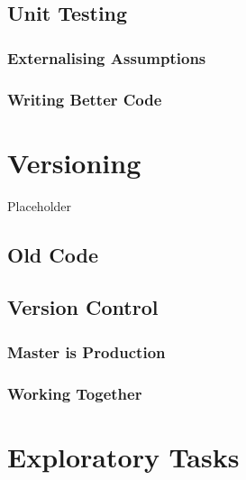 \documentclass[]{book}
\begin{document}
\hypertarget{unit-testing}{%
\section{Unit Testing}\label{unit-testing}}

\hypertarget{externalising-assumptions}{%
\subsection{Externalising Assumptions}\label{externalising-assumptions}}

\hypertarget{writing-better-code}{%
\subsection{Writing Better Code}\label{writing-better-code}}

\hypertarget{versioning}{%
\chapter{Versioning}\label{versioning}}

Placeholder

\hypertarget{old-code}{%
\section{Old Code}\label{old-code}}

\hypertarget{version-control}{%
\section{Version Control}\label{version-control}}

\hypertarget{master-is-production}{%
\subsection{Master is Production}\label{master-is-production}}

\hypertarget{working-together}{%
\subsection{Working Together}\label{working-together}}

\hypertarget{exploratory-tasks}{%
\chapter{Exploratory Tasks}\label{exploratory-tasks}}
\end{document}

